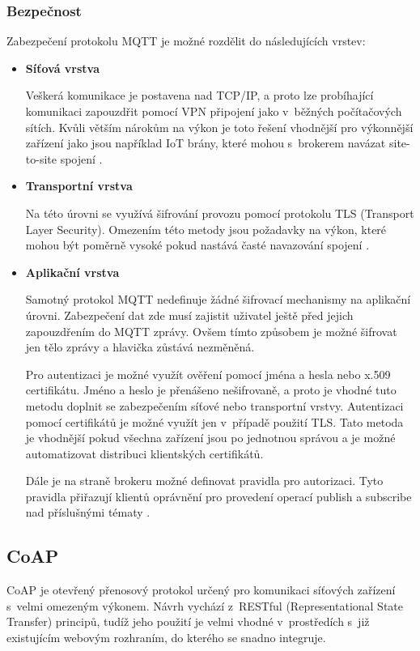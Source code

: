  \subsubsection{Bezpečnost}
 Zabezpečení protokolu MQTT je možné rozdělit do následujících vrstev:
 \begin{itemize}
  \item \textbf{Síťová vrstva}
  
    Veškerá komunikace je postavena nad TCP/IP, a proto lze probíhající komunikaci
    zapouzdřit pomocí VPN připojení
    jako v~běžných počítačových sítích. Kvůli větším nárokům na výkon je toto
    řešení vhodnější pro výkonnější zařízení jako jsou například IoT brány, které
    mohou s~brokerem navázat site-to-site spojení \cite{mqtt_sec}.
    
  \item \textbf{Transportní vrstva}
  
  Na této úrovni se využívá šifrování provozu pomocí protokolu TLS (Tra\-nsport
  Layer Security). Omezením této metody jsou požadavky na výkon, které mohou být
  poměrně vysoké pokud nastává časté navazování spojení \cite{mqtt_sec}.
  
  \item \textbf{Aplikační vrstva}
  
  Samotný protokol MQTT nedefinuje žádné šifrovací mechanismy na aplikační úrovni. 
  Zabezpečení dat zde musí zajistit uživatel ještě před jejich zapouzdřením do MQTT zprávy. 
  Ovšem tímto způsobem je možné šifrovat jen tělo zprávy a hlavička zůstává nezměněná.
  
  Pro autentizaci je možné využít ověření pomocí jména a hesla nebo x.509 certifikátu.
  Jméno a heslo je přenášeno nešifrovaně, a proto je vhodné tuto metodu doplnit se 
  zabezpečením síťové nebo transportní vrstvy. Autentizaci pomocí certifikátů 
  je možné využít jen v~případě použití TLS. Tato metoda je vhodnější pokud všechna
  zařízení jsou po jednotnou správou a je možné automatizovat distribuci 
  klientských certifikátů.
  
  Dále je na straně brokeru možné definovat pravidla pro autorizaci. Tyto pravidla 
  přiřazují klientů oprávnění pro provedení operací publish a subscribe
  nad příslušnými tématy \cite{mqtt_sec}.
  
 \end{itemize}

  \subsection{CoAP}
  CoAP je otevřený přenosový protokol určený pro
  komunikaci síťových zařízení s~velmi omezeným výkonem. Návrh vychází z~RESTful
  (Representational State Transfer) principů, tudíž jeho použití je velmi vhodné
  v~prostředích s~již existujícím webovým rozhraním, do kterého se snadno integruje. \cite{coap}
  

